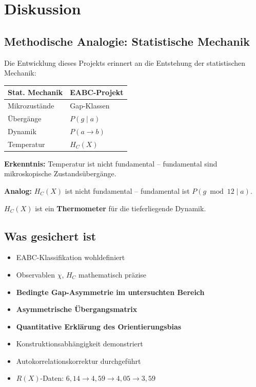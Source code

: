 \documentclass[11pt,a4paper]{article}
\begin{document}
\section{Diskussion}

\subsection{Methodische Analogie: Statistische Mechanik}

Die Entwicklung dieses Projekts erinnert an die Entstehung der statistischen Mechanik:

\begin{center}
\begin{tabular}{ll}
\textbf{Stat. Mechanik} & \textbf{EABC-Projekt} \\ \hline
Mikrozustände & Gap-Klassen \\
Übergänge & $P(g \mid a)$ \\
Dynamik & $P(a \to b)$ \\
Temperatur & $H_C(X)$
\end{tabular}
\end{center}

\textbf{Erkenntnis:} Temperatur ist nicht fundamental -- fundamental sind mikroskopische Zustandsübergänge.

\textbf{Analog:} $H_C(X)$ ist nicht fundamental -- fundamental ist $P(g \bmod 12 \mid a)$.

$H_C(X)$ ist ein \textbf{Thermometer} für die tieferliegende Dynamik.

\subsection{Was gesichert ist}

\begin{itemize}
\item[$\checkmark$] EABC-Klassifikation wohldefiniert
\item[$\checkmark$] Observablen $\chi$, $H_C$ mathematisch präzise
\item[$\checkmark$] \textbf{Bedingte Gap-Asymmetrie im untersuchten Bereich}
\item[$\checkmark$] \textbf{Asymmetrische Übergangsmatrix}
\item[$\checkmark$] \textbf{Quantitative Erklärung des Orientierungsbias}
\item[$\checkmark$] Konstruktionsabhängigkeit demonstriert
\item[$\checkmark$] Autokorrelationskorrektur durchgeführt
\item[$\checkmark$] $R(X)$-Daten: $6{,}14 \to 4{,}59 \to 4{,}05 \to 3{,}59$
\end{itemize}
\end{document}
